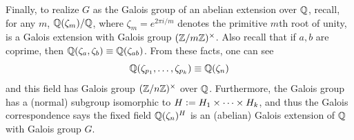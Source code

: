 \documentclass[12pt]{article}
\begin{document}
Finally, to realize $G$ as the Galois group of an abelian extension over $\mathbb{Q}$, recall, for any $m$, $\mathbb{Q}(\zeta_m) / \mathbb{Q}$, where $\zeta_m = e^{2\pi i / m}$ denotes the primitive $m$th root of unity, is a Galois extension with Galois group $(\mathbb{Z} / m\mathbb{Z})^{\times}$. 
Also recall that if $a, b$ are coprime, then $\Q(\zeta_a, \zeta_b) \equiv \Q(\zeta_{ab})$. 
From these facts, one can see 
$$\Q(\zeta_{p_1}, \ldots, \zeta_{p_k}) \equiv \Q(\zeta_n)$$
and this field has Galois group $(\mathbb{Z} / n\mathbb{Z})^\times$ over $\mathbb{Q}$. 
Furthermore, the Galois group has a (normal) subgroup isomorphic to $H \vcentcolon= H_1 \times \cdots \times H_k$, and thus the Galois correspondence says the fixed field $\mathbb{Q}(\zeta_n)^{H}$ is an (abelian) Galois extension of $\mathbb{Q}$ with Galois group $G$. 
\end{document}

